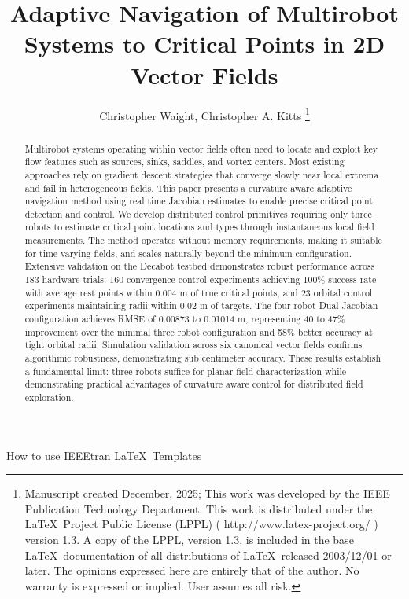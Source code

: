 \documentclass[lettersize,journal]{IEEEtran}
\begin{document}
\title{Adaptive Navigation of Multirobot Systems to Critical Points in 2D Vector Fields}
\author{Christopher Waight, Christopher A. Kitts
\thanks{Manuscript created December, 2025; This work was developed by the IEEE Publication Technology Department. This work is distributed under the \LaTeX \ Project Public License (LPPL) ( http://www.latex-project.org/ ) version 1.3. A copy of the LPPL, version 1.3, is included in the base \LaTeX \ documentation of all distributions of \LaTeX \ released 2003/12/01 or later. The opinions expressed here are entirely that of the author. No warranty is expressed or implied. User assumes all risk.}}
%
{How to use IEEEtran \LaTeX \ Templates}

\maketitle

\begin{abstract}
Multirobot systems operating within vector fields often need to locate and exploit key flow features such as sources, sinks, saddles, and vortex centers. Most existing approaches rely on gradient descent strategies that converge slowly near local extrema and fail in heterogeneous fields. This paper presents a curvature aware adaptive navigation method using real time Jacobian estimates to enable precise critical point detection and control. We develop distributed control primitives requiring only three robots to estimate critical point locations and types through instantaneous local field measurements. The method operates without memory requirements, making it suitable for time varying fields, and scales naturally beyond the minimum configuration. Extensive validation on the Decabot testbed demonstrates robust performance across 183 hardware trials: 160 convergence control experiments achieving 100\% success rate with average rest points within 0.004 m of true critical points, and 23 orbital control experiments maintaining radii within 0.02 m of targets. The four robot Dual Jacobian configuration achieves RMSE of 0.00873 to 0.01014 m, representing 40 to 47\% improvement over the minimal three robot configuration and 58\% better accuracy at tight orbital radii. Simulation validation across six canonical vector fields confirms algorithmic robustness, demonstrating sub centimeter accuracy. These results establish a fundamental limit: three robots suffice for planar field characterization while demonstrating practical advantages of curvature aware control for distributed field exploration.
\end{abstract}
\end{document}
